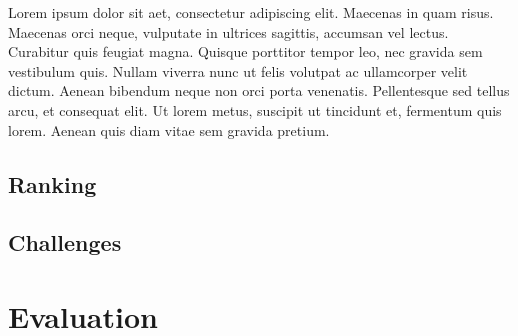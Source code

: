 \documentclass{article}
\begin{document}
Lorem ipsum dolor sit aet, consectetur adipiscing elit. Maecenas in quam risus. Maecenas orci neque, vulputate in ultrices sagittis, accumsan vel lectus. Curabitur quis feugiat magna. Quisque porttitor tempor leo, nec gravida sem vestibulum quis. Nullam viverra nunc ut felis volutpat ac ullamcorper velit dictum. Aenean bibendum neque non orci porta venenatis. Pellentesque sed tellus arcu, et consequat elit. Ut lorem metus, suscipit ut tincidunt et, fermentum quis lorem. Aenean quis diam vitae sem gravida pretium.

\subsection{Ranking}
\subsection{Challenges}

\section{Evaluation}

\end{document}
